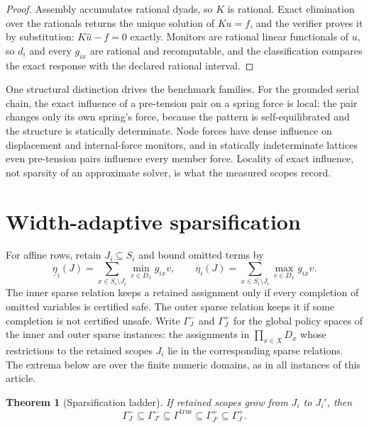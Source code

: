 \documentclass[11pt]{article}
\theoremstyle{plain}
\newtheorem{theorem}{Theorem}[section]
\theoremstyle{definition}
\theoremstyle{remark}
\begin{document}
\begin{proof}
Assembly accumulates rational dyads, so \(K\) is rational.  Exact
elimination over the rationals returns the unique solution of \(Ku=f\), and
the verifier proves it by substitution: \(K\widehat u-f=0\) exactly.
Monitors are rational linear functionals of \(u\), so \(d_i\) and every
\(g_{ix}\) are rational and recomputable, and the classification compares
the exact response with the declared rational interval.
\end{proof}

One structural distinction drives the benchmark families.  For the grounded
serial chain, the exact influence of a pre-tension pair on a spring force is
local: the pair changes only its own spring's force, because the pattern is
self-equilibrated and the structure is statically determinate.  Node forces
have dense influence on displacement and internal-force monitors, and in
statically indeterminate lattices even pre-tension pairs influence every
member force.  Locality of exact influence, not sparsity of an approximate
solver, is what the measured scopes record.

\section{Width-adaptive sparsification}
\label{sec:sparsification}

For affine rows, retain \(J_i\subseteq S_i\) and bound omitted terms by
\[
\underline\eta_i(J)=
\sum_{x\in S_i\setminus J_i}\min_{v\in D_x}g_{ix}v,
\qquad
\overline\eta_i(J)=
\sum_{x\in S_i\setminus J_i}\max_{v\in D_x}g_{ix}v.
\]
The inner sparse relation keeps a retained assignment only if every completion
of omitted variables is certified safe.  The outer sparse relation keeps it if
some completion is not certified unsafe.  Write \(\Gamma^-_J\) and
\(\Gamma^+_J\) for the global policy spaces of the inner and outer sparse
instances: the assignments in \(\prod_{x\in X}D_x\) whose restrictions to
the retained scopes \(J_i\) lie in the corresponding sparse relations.  The
extrema below are over the finite numeric domains, as in all instances of
this article.

\begin{theorem}[Sparsification ladder]
If retained scopes grow from \(J_i\) to \(J_i'\), then
\[
  \Gamma^-_J
  \subseteq
  \Gamma^-_{J'}
  \subseteq
  \Gamma^{\mathrm{true}}
  \subseteq
  \Gamma^+_{J'}
  \subseteq
  \Gamma^+_J.
\]
\end{theorem}
\end{document}
